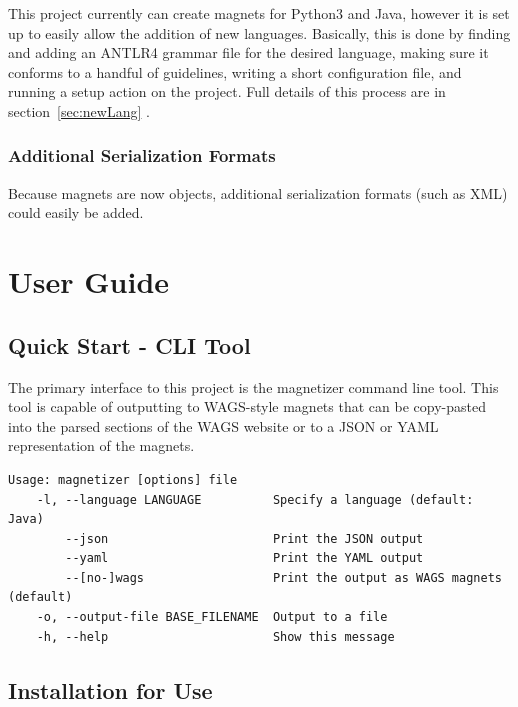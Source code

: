 \documentclass[letter,10pt]{article}
\begin{document}
This project currently can create magnets for Python3 and Java, however 
it is set up to easily allow the addition of new languages. 
Basically, this is done by finding and adding an ANTLR4 grammar file 
for the desired language, making sure it conforms to a handful of 
guidelines, writing a short configuration file, and running a setup 
action on the project. Full details of this process are in 
section~\ref{sec:newLang} .


\subsubsection{Additional Serialization Formats}

Because magnets are now objects, additional serialization formats (such 
as XML) could easily be added. 



\section{User Guide}

\subsection{Quick Start - CLI Tool}

The primary interface to this project is the magnetizer command line 
tool. This tool is capable of outputting to WAGS-style magnets that can 
be copy-pasted into the parsed sections of the WAGS website or to a 
JSON or YAML representation of the magnets.

\begin{verbatim}
Usage: magnetizer [options] file
    -l, --language LANGUAGE          Specify a language (default: Java)
        --json                       Print the JSON output
        --yaml                       Print the YAML output
        --[no-]wags                  Print the output as WAGS magnets 
(default)
    -o, --output-file BASE_FILENAME  Output to a file
    -h, --help                       Show this message
\end{verbatim}



\subsection{Installation for Use}
\end{document}
